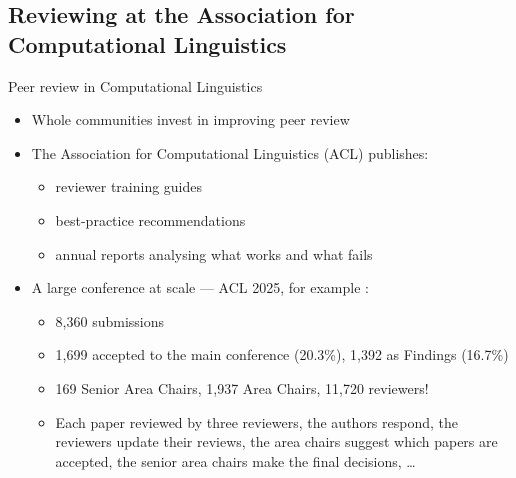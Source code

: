\documentclass[aspectratio=169]{beamer}
\begin{document}
\subsection{Reviewing at the Association for Computational Linguistics}

\begin{frame}{Peer review in Computational Linguistics}
\begin{itemize}
  \item Whole communities invest in improving peer review
  \item The Association for Computational Linguistics (ACL) publishes:
    \begin{itemize}
      \item reviewer training guides \citep{acl2023reviewbasics}
      \item best-practice recommendations  \citep{aclarrguidelines}
      \item annual reports analysing what works and what fails \citep{aclcopr2023}
    \end{itemize}
  \item A large conference at scale --- ACL 2025, for example \citep{acl2025pcreport}:
    \begin{itemize}
    \item  8,360 submissions
    \item  1,699 accepted to the main conference (20.3\%), 1,392 as Findings (16.7\%)
    \item  169 Senior Area Chairs, 1,937 Area Chairs, 11,720 reviewers!
    \item Each paper reviewed by three reviewers, the authors respond, the reviewers update their reviews,  the area chairs suggest which papers are accepted, the senior area chairs make the final decisions, \ldots
    \end{itemize}
\end{itemize}
\end{frame}

\end{document}
